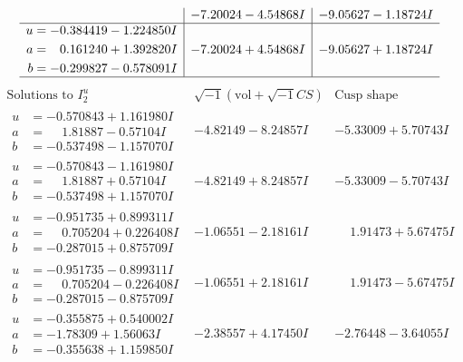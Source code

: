 \documentclass[1p]{elsarticle_modified}
\theoremstyle{definition}
\newcommand{\I}{\sqrt{-1}}
\begin{document}
$$\begin{array}{c|c|c}
 & -7.20024 - 4.54868 I & -9.05627 - 1.18724 I \\ \hline\begin{aligned}
u &= -0.384419 - 1.224850 I \\
a &= \phantom{-}0.161240 + 1.392820 I \\
b &= -0.299827 - 0.578091 I\end{aligned}
 & -7.20024 + 4.54868 I & -9.05627 + 1.18724 I\\
 \hline 
 \end{array}$$\newpage$$\begin{array}{c|c|c}  
\text{Solutions to }I^u_{2}& \I (\text{vol} + \sqrt{-1}CS) & \text{Cusp shape}\\
 \hline 
\begin{aligned}
u &= -0.570843 + 1.161980 I \\
a &= \phantom{-}1.81887 - 0.57104 I \\
b &= -0.537498 - 1.157070 I\end{aligned}
 & -4.82149 - 8.24857 I & -5.33009 + 5.70743 I \\ \hline\begin{aligned}
u &= -0.570843 - 1.161980 I \\
a &= \phantom{-}1.81887 + 0.57104 I \\
b &= -0.537498 + 1.157070 I\end{aligned}
 & -4.82149 + 8.24857 I & -5.33009 - 5.70743 I \\ \hline\begin{aligned}
u &= -0.951735 + 0.899311 I \\
a &= \phantom{-}0.705204 + 0.226408 I \\
b &= -0.287015 + 0.875709 I\end{aligned}
 & -1.06551 - 2.18161 I & \phantom{-}1.91473 + 5.67475 I \\ \hline\begin{aligned}
u &= -0.951735 - 0.899311 I \\
a &= \phantom{-}0.705204 - 0.226408 I \\
b &= -0.287015 - 0.875709 I\end{aligned}
 & -1.06551 + 2.18161 I & \phantom{-}1.91473 - 5.67475 I \\ \hline\begin{aligned}
u &= -0.355875 + 0.540002 I \\
a &= -1.78309 + 1.56063 I \\
b &= -0.355638 + 1.159850 I\end{aligned}
 & -2.38557 + 4.17450 I & -2.76448 - 3.64055 I \\ \hline\begin{aligned}

\end{aligned}
\end{array}$$
\end{document}
